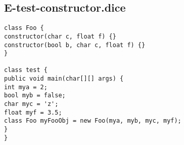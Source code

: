 \subsection{E-test-constructor.dice}
\begin{verbatim}
class Foo {
constructor(char c, float f) {}
constructor(bool b, char c, float f) {}
}

class test {
public void main(char[][] args) {
int mya = 2;
bool myb = false;
char myc = 'z';
float myf = 3.5;
class Foo myFooObj = new Foo(mya, myb, myc, myf);
}
}

\end{verbatim}